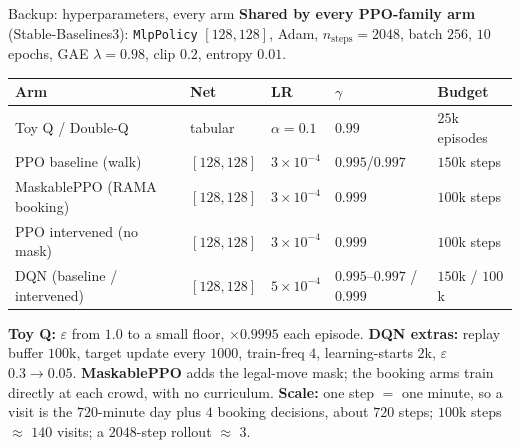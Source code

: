 \documentclass[aspectratio=169, 11pt, t]{beamer}
\begin{document}
\begin{frame}{Backup: hyperparameters, every arm}
\small
\vfill
\textbf{Shared by every PPO-family arm} (Stable-Baselines3): \texttt{MlpPolicy} $[128,128]$, Adam,
$n_{\text{steps}}=2048$, batch $256$, $10$ epochs, GAE $\lambda=0.98$, clip $0.2$, entropy $0.01$.
\vfill
\renewcommand{\arraystretch}{1.45}
\begin{center}
\begin{tabular}{l l l l l}
\toprule
Arm & Net & LR & $\gamma$ & Budget \\
\midrule
Toy Q / Double-Q & tabular & $\alpha=0.1$ & $0.99$ & $25$k episodes \\
PPO baseline (walk) & $[128,128]$ & $3\times10^{-4}$ & $0.995$/$0.997$ & $150$k steps \\
MaskablePPO (RAMA booking) & $[128,128]$ & $3\times10^{-4}$ & $0.999$ & $100$k steps \\
PPO intervened (no mask) & $[128,128]$ & $3\times10^{-4}$ & $0.999$ & $100$k steps \\
DQN (baseline / intervened) & $[128,128]$ & $5\times10^{-4}$ & $0.995$--$0.997$ / $0.999$ & $150$k / $100$k \\
\bottomrule
\end{tabular}
\end{center}
\vfill
\footnotesize
\textbf{Toy Q:} $\varepsilon$ from $1.0$ to a small floor, $\times0.9995$ each episode.
\textbf{DQN extras:} replay buffer $100$k, target update every $1000$, train-freq $4$, learning-starts
$2$k, $\varepsilon$ $0.3\to0.05$. \textbf{MaskablePPO} adds the legal-move mask; the booking arms train
directly at each crowd, with no curriculum.
\textbf{Scale:} one step $=$ one minute, so a visit is the $720$-minute day plus $4$ booking decisions,
about $720$ steps; $100$k steps $\approx$ $140$ visits; a $2048$-step rollout $\approx$ $3$.
\vfill
\end{frame}
\end{document}
